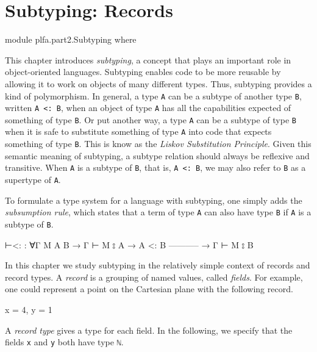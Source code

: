 \hypertarget{Subtyping}{%
\chapter{Subtyping: Records}\label{Subtyping}}

\begin{fence}
\begin{code}
module plfa.part2.Subtyping where
\end{code}
\end{fence}

This chapter introduces \emph{subtyping}, a concept that plays an
important role in object-oriented languages. Subtyping enables code to
be more reusable by allowing it to work on objects of many different
types. Thus, subtyping provides a kind of polymorphism. In general, a
type \texttt{A} can be a subtype of another type \texttt{B}, written
\texttt{A\ \textless{}:\ B}, when an object of type \texttt{A} has all
the capabilities expected of something of type \texttt{B}. Or put
another way, a type \texttt{A} can be a subtype of type \texttt{B} when
it is safe to substitute something of type \texttt{A} into code that
expects something of type \texttt{B}. This is know as the \emph{Liskov
Substitution Principle}. Given this semantic meaning of subtyping, a
subtype relation should always be reflexive and transitive. When
\texttt{A} is a subtype of \texttt{B}, that is,
\texttt{A\ \textless{}:\ B}, we may also refer to \texttt{B} as a
supertype of \texttt{A}.

To formulate a type system for a language with subtyping, one simply
adds the \emph{subsumption rule}, which states that a term of type
\texttt{A} can also have type \texttt{B} if \texttt{A} is a subtype of
\texttt{B}.

\begin{myDisplay}
⊢<: : ∀{Γ M A B}
  → Γ ⊢ M ⦂ A
→ A <: B
    -----------
  → Γ ⊢ M ⦂ B
\end{myDisplay}

In this chapter we study subtyping in the relatively simple context of
records and record types. A \emph{record} is a grouping of named values,
called \emph{fields}. For example, one could represent a point on the
Cartesian plane with the following record.

\begin{myDisplay}
{ x = 4, y = 1 }
\end{myDisplay}

A \emph{record type} gives a type for each field. In the following, we
specify that the fields \texttt{x} and \texttt{y} both have type
\texttt{ℕ}.

